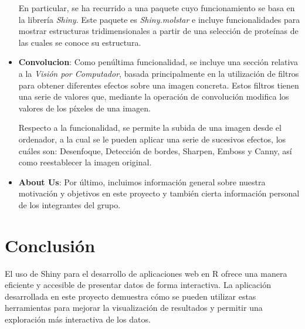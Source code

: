 \documentclass[10pt,a4paper]{article}
\begin{document}
\begin{itemize}
    \noindent En particular, se ha recurrido a una paquete cuyo funcionamiento se basa en la librería \textit{Shiny}. Este paquete es \textit{Shiny.molstar} e incluye funcionalidades para mostrar estructuras tridimensionales a partir de una selección de proteínas de las cuales se conoce su estructura.

    \item \textbf{Convolucion}: Como penúltima funcionalidad, se incluye una sección relativa a la \textit{Visión por Computador}, basada principalmente en la utilización de filtros para obtener diferentes efectos sobre una imagen concreta. Estos filtros tienen una serie de valores que, mediante la operación de convolución modifica los valores de los píxeles de una imagen.

    \noindent Respecto a la funcionalidad, se permite la subida de una imagen desde el ordenador, a la cual se le pueden aplicar una serie de sucesivos efectos, los cuáles son: Desenfoque, Detección de bordes, Sharpen, Emboss y Canny, así como reestablecer la imagen original.
    
    \item \textbf{About Us}: Por último, incluimos información general sobre nuestra motivación y objetivos en este proyecto y también cierta información personal de los integrantes del grupo.
\end{itemize}

\section{Conclusión}
\noindent El uso de Shiny para el desarrollo de aplicaciones web en R ofrece una manera eficiente y accesible de presentar datos de forma interactiva. La aplicación desarrollada en este proyecto demuestra cómo se pueden utilizar estas herramientas para mejorar la visualización de resultados y permitir una exploración más interactiva de los datos.
\end{document}

